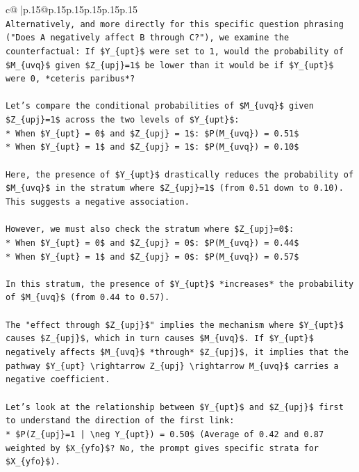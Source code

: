 \documentclass{article}
\begin{document}
{\begin{supertabular}{c@{$\;$}|p{.15\linewidth}@{}p{.15\linewidth}p{.15\linewidth}p{.15\linewidth}p{.15\linewidth}p{.15\linewidth}}
{{{\\ 
\texttt{Alternatively, and more directly for this specific question phrasing ("Does A negatively affect B through C?"), we examine the counterfactual: If \$Y\_\{upt\}\$ were set to 1, would the probability of \$M\_\{uvq\}\$ given \$Z\_\{upj\}=1\$ be lower than it would be if \$Y\_\{upt\}\$ were 0, *ceteris paribus*?} \\
\\ 
\texttt{Let's compare the conditional probabilities of \$M\_\{uvq\}\$ given \$Z\_\{upj\}=1\$ across the two levels of \$Y\_\{upt\}\$:} \\
\texttt{*   When \$Y\_\{upt\} = 0\$ and \$Z\_\{upj\} = 1\$: \$P(M\_\{uvq\}) = 0.51\$} \\
\texttt{*   When \$Y\_\{upt\} = 1\$ and \$Z\_\{upj\} = 1\$: \$P(M\_\{uvq\}) = 0.10\$} \\
\\ 
\texttt{Here, the presence of \$Y\_\{upt\}\$ drastically reduces the probability of \$M\_\{uvq\}\$ in the stratum where \$Z\_\{upj\}=1\$ (from 0.51 down to 0.10). This suggests a negative association.} \\
\\ 
\texttt{However, we must also check the stratum where \$Z\_\{upj\}=0\$:} \\
\texttt{*   When \$Y\_\{upt\} = 0\$ and \$Z\_\{upj\} = 0\$: \$P(M\_\{uvq\}) = 0.44\$} \\
\texttt{*   When \$Y\_\{upt\} = 1\$ and \$Z\_\{upj\} = 0\$: \$P(M\_\{uvq\}) = 0.57\$} \\
\\ 
\texttt{In this stratum, the presence of \$Y\_\{upt\}\$ *increases* the probability of \$M\_\{uvq\}\$ (from 0.44 to 0.57).} \\
\\ 
\texttt{The "effect through \$Z\_\{upj\}\$" implies the mechanism where \$Y\_\{upt\}\$ causes \$Z\_\{upj\}\$, which in turn causes \$M\_\{uvq\}\$. If \$Y\_\{upt\}\$ negatively affects \$M\_\{uvq\}\$ *through* \$Z\_\{upj\}\$, it implies that the pathway \$Y\_\{upt\} \textbackslash{}rightarrow Z\_\{upj\} \textbackslash{}rightarrow M\_\{uvq\}\$ carries a negative coefficient.} \\
\\ 
\texttt{Let's look at the relationship between \$Y\_\{upt\}\$ and \$Z\_\{upj\}\$ first to understand the direction of the first link:} \\
\texttt{*   \$P(Z\_\{upj\}=1 | \textbackslash{}neg Y\_\{upt\}) = 0.50\$ (Average of 0.42 and 0.87 weighted by \$X\_\{yfo\}\$? No, the prompt gives specific strata for \$X\_\{yfo\}\$).} \\
}}}
\end{supertabular}}
\end{document}
